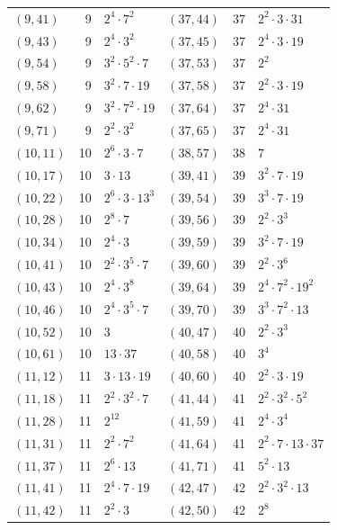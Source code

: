 \documentclass[11pt]{article}
\begin{document}
\begin{longtable}{@{}lrl@{\qquad}lrl@{}}
$(9,41)$ & 9 & $2^{4}\cdot 7^{2}$ & $(37,44)$ & 37 & $2^{2}\cdot 3\cdot 31$\\
$(9,43)$ & 9 & $2^{4}\cdot 3^{2}$ & $(37,45)$ & 37 & $2^{4}\cdot 3\cdot 19$\\
$(9,54)$ & 9 & $3^{2}\cdot 5^{2}\cdot 7$ & $(37,53)$ & 37 & $2^{2}$\\
$(9,58)$ & 9 & $3^{2}\cdot 7\cdot 19$ & $(37,58)$ & 37 & $2^{2}\cdot 3\cdot 19$\\
$(9,62)$ & 9 & $3^{2}\cdot 7^{2}\cdot 19$ & $(37,64)$ & 37 & $2^{4}\cdot 31$\\
$(9,71)$ & 9 & $2^{2}\cdot 3^{2}$ & $(37,65)$ & 37 & $2^{4}\cdot 31$\\
$(10,11)$ & 10 & $2^{6}\cdot 3\cdot 7$ & $(38,57)$ & 38 & $7$\\
$(10,17)$ & 10 & $3\cdot 13$ & $(39,41)$ & 39 & $3^{2}\cdot 7\cdot 19$\\
$(10,22)$ & 10 & $2^{6}\cdot 3\cdot 13^{3}$ & $(39,54)$ & 39 & $3^{3}\cdot 7\cdot 19$\\
$(10,28)$ & 10 & $2^{8}\cdot 7$ & $(39,56)$ & 39 & $2^{2}\cdot 3^{3}$\\
$(10,34)$ & 10 & $2^{4}\cdot 3$ & $(39,59)$ & 39 & $3^{2}\cdot 7\cdot 19$\\
$(10,41)$ & 10 & $2^{2}\cdot 3^{5}\cdot 7$ & $(39,60)$ & 39 & $2^{2}\cdot 3^{6}$\\
$(10,43)$ & 10 & $2^{4}\cdot 3^{8}$ & $(39,64)$ & 39 & $2^{4}\cdot 7^{2}\cdot 19^{2}$\\
$(10,46)$ & 10 & $2^{4}\cdot 3^{5}\cdot 7$ & $(39,70)$ & 39 & $3^{3}\cdot 7^{2}\cdot 13$\\
$(10,52)$ & 10 & $3$ & $(40,47)$ & 40 & $2^{2}\cdot 3^{3}$\\
$(10,61)$ & 10 & $13\cdot 37$ & $(40,58)$ & 40 & $3^{4}$\\
$(11,12)$ & 11 & $3\cdot 13\cdot 19$ & $(40,60)$ & 40 & $2^{2}\cdot 3\cdot 19$\\
$(11,18)$ & 11 & $2^{2}\cdot 3^{2}\cdot 7$ & $(41,44)$ & 41 & $2^{2}\cdot 3^{2}\cdot 5^{2}$\\
$(11,28)$ & 11 & $2^{12}$ & $(41,59)$ & 41 & $2^{4}\cdot 3^{4}$\\
$(11,31)$ & 11 & $2^{2}\cdot 7^{2}$ & $(41,64)$ & 41 & $2^{2}\cdot 7\cdot 13\cdot 37$\\
$(11,37)$ & 11 & $2^{6}\cdot 13$ & $(41,71)$ & 41 & $5^{2}\cdot 13$\\
$(11,41)$ & 11 & $2^{4}\cdot 7\cdot 19$ & $(42,47)$ & 42 & $2^{2}\cdot 3^{2}\cdot 13$\\
$(11,42)$ & 11 & $2^{2}\cdot 3$ & $(42,50)$ & 42 & $2^{8}$\\

\end{longtable}
\end{document}
